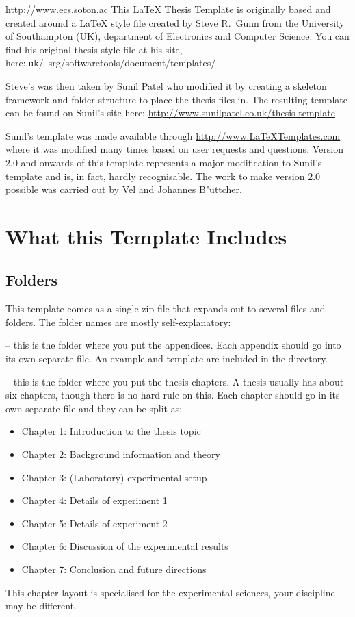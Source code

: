 \url{http://www.ecs.soton.ac} This \LaTeX{} Thesis Template is originally based
and created around a \LaTeX{} style file created by Steve R.\ Gunn from the
University of Southampton (UK), department of Electronics and Computer Science.
You can find his original thesis style file at his site,
here:.uk/~srg/softwaretools/document/templates/

Steve's  was then taken by Sunil Patel who modified it by
creating a skeleton framework and folder structure to place the thesis files in.
The resulting template can be found on Sunil's site here:
\url{http://www.sunilpatel.co.uk/thesis-template}

Sunil's template was made available through \url{http://www.LaTeXTemplates.com}
where it was modified many times based on user requests and questions. Version
2.0 and onwards of this template represents a major modification to Sunil's
template and is, in fact, hardly recognisable. The work to make version 2.0
possible was carried out by \href{mailto:vel@latextemplates.com}{Vel} and
Johannes B"{u}ttcher.


\section{What this Template Includes}

\subsection{Folders}

This template comes as a single zip file that expands out to several files and
folders. The folder names are mostly self-explanatory:

 -- this is the folder where you put the appendices. Each
appendix should go into its own separate  file. An example and
template are included in the directory.

 -- this is the folder where you put the thesis chapters. A
thesis usually has about six chapters, though there is no hard rule on this.
Each chapter should go in its own separate  file and they can be
split as:
\begin{itemize}
\item Chapter 1: Introduction to the thesis topic
\item Chapter 2: Background information and theory
\item Chapter 3: (Laboratory) experimental setup
\item Chapter 4: Details of experiment 1
\item Chapter 5: Details of experiment 2
\item Chapter 6: Discussion of the experimental results
\item Chapter 7: Conclusion and future directions
\end{itemize}
This chapter layout is specialised for the experimental sciences, your discipline may be different.


